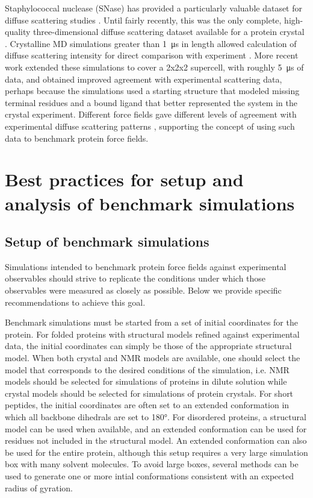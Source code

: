 \documentclass[9pt,review]{livecoms}
\begin{document}
Staphylococcal nuclease (SNase) has provided a particularly valuable dataset for diffuse scattering studies \cite{wall_three-dimensional_1997}.
Until fairly recently, this was the only complete, high-quality three-dimensional diffuse scattering dataset available for a protein crystal \cite{wall_conformational_2014}.
Crystalline MD simulations greater than \qty{1}{\micro\second} in length allowed calculation of diffuse scattering intensity for direct comparison with experiment \cite{wall_conformational_2014}.
More recent work \cite{wall_internal_2018} extended these simulations to cover a 2x2x2 supercell, with roughly \qty{5}{\micro\second} of data, and obtained improved agreement with experimental scattering data, perhaps because the simulations used a starting structure that modeled missing terminal residues and a bound ligand that better represented the system in the crystal experiment.
Different force fields gave different levels of agreement with experimental diffuse scattering patterns \cite{wych_liquid-like_2019}, supporting the concept of using such data to benchmark protein force fields.

\section{Best practices for setup and analysis of benchmark simulations}
\label{sec:best_practices}

\subsection{Setup of benchmark simulations}
\label{sub:best_practices_setup}

Simulations intended to benchmark protein force fields against experimental observables should strive to replicate the conditions under which those observables were measured as closely as possible. Below we provide specific recommendations to achieve this goal.

Benchmark simulations must be started from a set of initial coordinates for the protein.
For folded proteins with structural models refined against experimental data, the initial coordinates can simply be those of the appropriate structural model.
When both crystal and NMR models are available, one should select the model that corresponds to the desired conditions of the simulation, i.e. NMR models should be selected for simulations of proteins in dilute solution while crystal models should be selected for simulations of protein crystals.
For short peptides, the initial coordinates are often set to an extended conformation in which all backbone dihedrals are set to \ang{180}.
For disordered proteins, a structural model can be used when available, and an extended conformation can be used for residues not included in the structural model.
An extended conformation can also be used for the entire protein, although this setup requires a very large simulation box with many solvent molecules.
To avoid large boxes, several methods \cite{feldman_fast_2000,feldman_probabilistic_2002,ozenne_flexible-meccano_2012,estana_realistic_2019,ferrie_unified_2020,teixeira_idpconformergenerator_2022} can be used to generate one or more intial conformations consistent with an expected radius of gyration.
\end{document}
